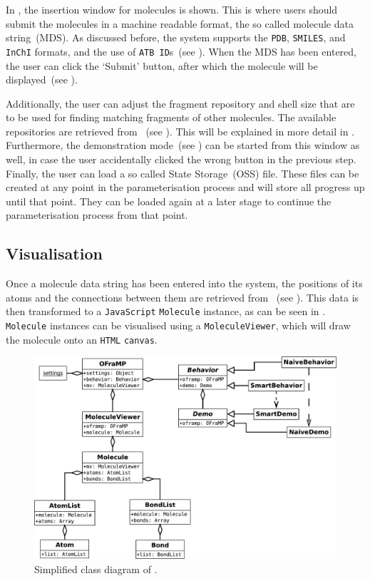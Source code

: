 In , the insertion window for molecules is shown. This is where users should submit the molecules in a machine readable format, the so called molecule data string~(MDS). As discussed before, the system supports the \verb|PDB|, \verb|SMILES|, and \verb|InChI| formats, and the use of \verb|ATB ID|s~(see ). When the MDS has been entered, the user can click the `Submit' button, after which the molecule will be displayed~(see ).

Additionally, the user can adjust the fragment repository and shell size that are to be used for finding matching fragments of other molecules. The available repositories are retrieved from \omfraf~(see ). This will be explained in more detail in . Furthermore, the demonstration mode~(see ) can be started from this window as well, in case the user accidentally clicked the wrong button in the previous step. Finally, the user can load a so called \oframp{} State Storage~(OSS) file. These files can be created at any point in the parameterisation process and will store all progress up until that point. They can be loaded again at a later stage to continue the parameterisation process from that point.


\subsection{Visualisation}
Once a molecule data string has been entered into the system, the positions of its atoms and the connections between them are retrieved from \oapoc~(see ). This data is then transformed to a \verb|JavaScript| \verb|Molecule| instance, as can be seen in . \verb|Molecule| instances can be visualised using a \verb|MoleculeViewer|, which will draw the molecule onto an \verb|HTML| \verb|canvas|.

\begin{figure}
\center
\includegraphics[width=\textwidth]{img/oframp_class.pdf}
\caption{Simplified class diagram of \oframp.}
\end{figure}

